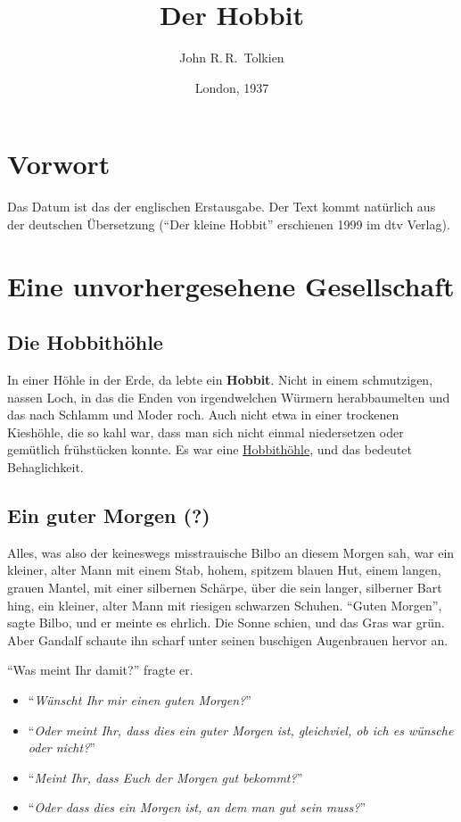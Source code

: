 \documentclass[a4paper, 12pt]{scrartcl}
\title{Der Hobbit}
\author{John R.\,R.~Tolkien}
\date{London, 1937}
\begin{document}
%
%
\section*{Vorwort}
Das Datum ist das der englischen Erstausgabe. Der Text kommt natürlich
aus der deutschen Übersetzung (\enquote{Der kleine Hobbit} erschienen
1999 im dtv Verlag).
%
\section{Eine unvorhergesehene Gesellschaft}
%
\subsection*{Die Hobbithöhle}
In einer Höhle in der Erde, da lebte ein \textbf{Hobbit}. 
Nicht in einem schmutzigen, nassen Loch, 
in das die Enden von irgendwelchen Würmern herabbaumelten 
und das nach Schlamm und Moder roch. 
Auch nicht etwa in einer trockenen Kieshöhle, die so kahl war, 
dass man sich nicht einmal niedersetzen oder gemütlich frühstücken konnte. 
Es war eine \underline{Hobbithöhle}, und das bedeutet Behaglichkeit.
%
\subsection*{Ein guter Morgen (?)}
Alles, was also der keineswegs misstrauische Bilbo an diesem Morgen sah,
war ein kleiner, alter Mann mit einem Stab, hohem, spitzem blauen Hut, 
einem langen, grauen Mantel, mit einer silbernen Schärpe,  
über die sein langer, silberner Bart hing, 
ein kleiner, alter Mann mit riesigen schwarzen Schuhen.
%
\enquote{Guten Morgen}, sagte Bilbo, und er meinte es ehrlich. 
Die Sonne schien, und das Gras war grün. 
Aber Gandalf schaute ihn scharf unter seinen buschigen Augenbrauen hervor an.

\enquote{Was meint Ihr damit?} fragte er. 
\begin{itemize}
  \item \enquote{\emph{Wünscht Ihr mir einen guten Morgen?}}

  \item \enquote{\emph{Oder meint Ihr, dass dies ein guter Morgen
        ist, gleichviel, ob ich es wünsche oder nicht?}}
  \item \enquote{\emph{Meint Ihr, dass Euch der Morgen gut bekommt?}}
  \item \enquote{\emph{Oder dass dies ein Morgen ist, an dem man gut
        sein muss?}}
\end{itemize}
\end{document}
